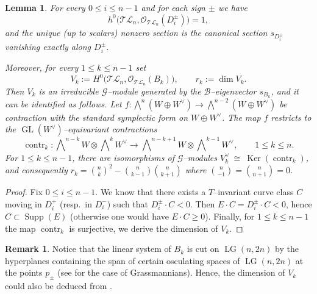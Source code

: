 \documentclass[10pt]{amsart}
\newtheorem{lemma}[theorem]{Lemma}
\theoremstyle{definition}
\newtheorem{remark}[theorem]{Remark}
\newcommand{\OO}{\mathcal{O}}
\newcommand{\LG}{\operatorname{LG}}
\DeclareMathOperator{\Supp}{Supp}
\DeclareMathOperator{\Ker}{Ker}
\DeclareMathOperator{\contr}{contr}
\newcommand{\TL}{\mathcal{TL}}
\newcommand{\GL}{\operatorname{GL}}
\theoremstyle{plain} %
\begin{document}
\begin{lemma}\label{cohBC}
For every $0\le i\le n-1$ and for each sign $\pm$ we have
\[
h^0\bigl(\TL_n,\OO_{\TL_n}(D_i^\pm)\bigr)=1,
\]
and the unique (up to scalars) nonzero section is the canonical section
$s_{D_i^\pm}$ vanishing exactly along $D_i^\pm$.

Moreover, for every $1\le k\le n-1$ set
\[
V_k:=H^0\bigl(\TL_n,\OO_{\TL_n}(B_k)\bigr),\qquad r_k:=\dim V_k.
\]
Then $V_k$ is an irreducible $\mathscr{G}$--module generated by the
$\mathscr{B}$--eigenvector $s_{B_k}$, and it can be identified as follows.
Let
$f\colon\bigwedge\nolimits^n (W\oplus W^\vee) \longrightarrow \bigwedge\nolimits^{n-2} (W\oplus W^\vee)$
be contraction with the standard symplectic form on $W\oplus W^\vee$. %
The map $f$ restricts to the $\GL(W^\vee)$--equivariant contractions
\[
\contr_k\colon\bigwedge\nolimits^{n-k}W\otimes \bigwedge\nolimits^k W^\vee
\longrightarrow
\bigwedge\nolimits^{n-k+1}W\otimes \bigwedge\nolimits^{k-1} W^\vee,
\qquad 1\le k\le n.
\]
For $1\le k\le n-1$, there are isomorphisms of $\mathscr{G}$--modules $V_k^\vee \ \cong\ \Ker(\contr_k)$, 
and consequently $r_k =\binom{n}{k}^2-\binom{n}{k-1}\binom{n}{k+1}$ 
where $\binom{n}{-1}=\binom{n}{n+1}=0$.
\end{lemma}

\begin{proof}
Fix $0\le i\le n-1$. We know that there exists a $T$--invariant curve class $C$ moving in $D_i^+$ (resp.\ in $D_i^-$) such that $D_i^\pm\cdot C<0$. Then $E\cdot C=D_i^\pm\cdot C<0$, hence $C\subset \Supp(E)$ (otherwise one would have $E\cdot C\ge0$). Finally, for $1\le k\le n-1$ the map $\contr_k$ is surjective, we derive the dimension of $V_k$.
\end{proof}

\begin{remark}\label{cohBC_Geom}
Notice that the linear system of $B_k$ is cut on $\LG(n,2n)$ by the hyperplanes containing the span of certain osculating spaces of $\LG(n,2n)$ at the points $p_{\pm}$ (see \cite[Lemma 3.9]{F26} for the case of Grassmannians). Hence, the dimension of $V_k$ could also be deduced from \cite[Proposition 3.9]{FMR20}.
\end{remark}
\end{document}
